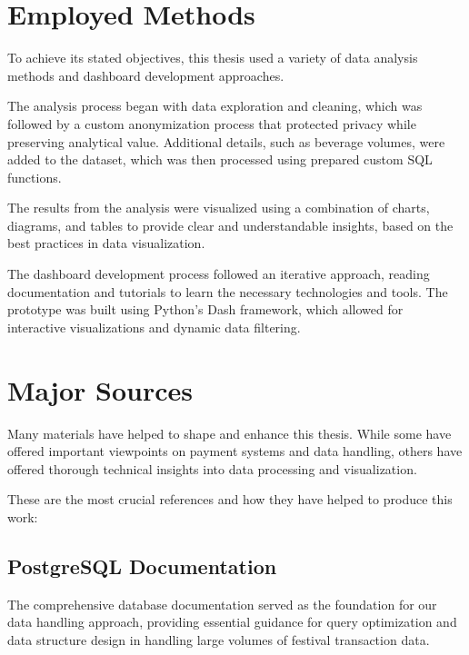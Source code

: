 \section*{Employed Methods}
\label{sec:employed-methods}
To achieve its stated objectives, this thesis used a variety of data analysis methods and dashboard development approaches.

The analysis process began with data exploration and cleaning, which was followed by a custom anonymization process that protected privacy while preserving analytical value.
Additional details, such as beverage volumes, were added to the dataset, which was then processed using prepared custom SQL functions.

The results from the analysis were visualized using a combination of charts, diagrams, and tables to provide clear and understandable insights, based on the best practices in data visualization.

The dashboard development process followed an iterative approach, reading documentation and tutorials to learn the necessary technologies and tools.
The prototype was built using Python's Dash framework, which allowed for interactive visualizations and dynamic data filtering.

\pagebreak[4]

\section*{Major Sources}
\label{sec:major-sources}
Many materials have helped to shape and enhance this thesis.
While some have offered important viewpoints on payment systems and data handling, others have offered thorough technical insights into data processing and visualization.

These are the most crucial references and how they have helped to produce this work:

\subsection*{PostgreSQL Documentation}
\label{subsec:postgresql-documentation}
The comprehensive database documentation served as the foundation for our data handling approach, providing essential guidance for query optimization and data structure design in handling large volumes of festival transaction data.

